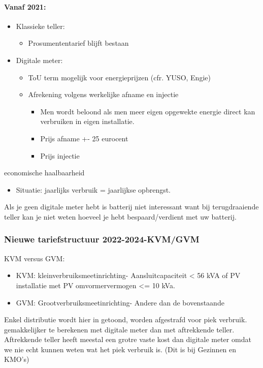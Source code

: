 \documentclass[12pt]{article}
\begin{document}
\paragraph{Vanaf 2021:}\begin{itemize}
    \item Klassieke teller:\begin{itemize}
        \item Prosumententarief blijft bestaan
    \end{itemize}
    \item Digitale meter:\begin{itemize}
        \item ToU term mogelijk voor energieprijzen (cfr. YUSO, Engie)
        \item Afrekening volgens werkelijke afname en injectie\begin{itemize}
            \item Men wordt beloond als men meer eigen opgewekte energie direct kan verbruiken in eigen installatie.
            \item Prijs afname +- 25 eurocent 
            \item Prijs injectie
        \end{itemize}
    \end{itemize}
\end{itemize}
economische haalbaarheid\begin{itemize}
    \item Situatie: jaarlijks verbruik = jaarlijkse opbrengst.
\end{itemize}
Als je geen digitale meter hebt is batterij niet interessant want bij terugdraaiende teller kan je niet weten hoeveel je hebt bespaard/verdient met uw batterij.
\subsubsection{Nieuwe tariefstructuur 2022-2024-KVM/GVM}
KVM versus GVM:\begin{itemize}
    \item KVM: kleinverbruiksmeetinrichting- Aansluitcapaciteit < 56 kVA of PV installatie met PV omvormervermogen <= 10 kVa. 
    \item GVM: Grootverbruiksmeetinrichting- Andere dan de bovenstaande
\end{itemize}
Enkel distributie wordt hier in getoond, worden afgestrafd voor piek verbruik. gemakkelijker te berekenen met digitale meter dan met aftrekkende teller. Aftrekkende teller heeft meestal een grotre vaste kost dan digitale meter omdat we nie echt kunnen weten wat het piek verbruik is. (Dit is bij Gezinnen en KMO's)
\end{document}
